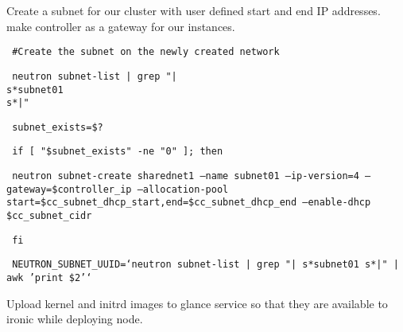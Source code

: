 \documentclass[12pt]{article}
\begin{document}
Create a subnet for our cluster with user defined start and end IP addresses. make controller as a gateway for our instances.

\begin{bash}\texttt{\small{ \#Create the subnet on the newly created network}}\end{bash}
\begin{bash}\texttt{\small{     neutron subnet-list | grep "|\\s*subnet01\\s*|"}}\end{bash}
\begin{bash}\texttt{\small{     subnet\_exists=\$?}}\end{bash}
\begin{bash}\texttt{\small{     if [ "\${subnet\_exists}" -ne "0" ]; then}}\end{bash}
\begin{bash}\texttt{\small{         neutron subnet-create sharednet1 --name subnet01 --ip-version=4 --gateway=\${controller\_ip} --allocation-pool start=\${cc\_subnet\_dhcp\_start},end=\${cc\_subnet\_dhcp\_end} --enable-dhcp \${cc\_subnet\_cidr}}}\end{bash}
\begin{bash}\texttt{\small{     fi}}\end{bash}
\begin{bash}\texttt{\small{     NEUTRON\_SUBNET\_UUID=`neutron subnet-list | grep "|\\s*subnet01\\s*|" | awk '{print \$2}'`}}\end{bash}

Upload kernel and initrd images to glance service so that they are available to ironic while deploying node.
\end{document}
